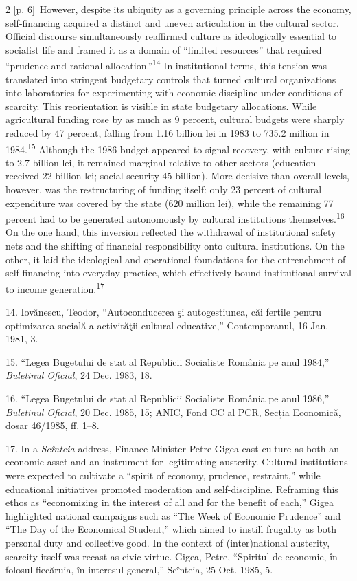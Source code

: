 \documentclass[10pt,a4paper]{article}
\begin{document}
\begin{paracol}{2}
{\scriptsize\color{gray} [p. 6]}\ However, despite its ubiquity as a governing principle across the economy, self-financing acquired a distinct and uneven articulation in the cultural sector. Official discourse simultaneously reaffirmed culture as ideologically essential to socialist life and framed it as a domain of “limited resources” that required “prudence and rational allocation.”\nobreak\textsuperscript{14} In institutional terms, this tension was translated into stringent budgetary controls that turned cultural organizations into laboratories for experimenting with economic discipline under conditions of scarcity. This reorientation is visible in state budgetary allocations. While agricultural funding rose by as much as 9 percent, cultural budgets were sharply reduced by 47 percent, falling from 1.16 billion lei in 1983 to 735.2 million in 1984.\nobreak\textsuperscript{15} Although the 1986 budget appeared to signal recovery, with culture rising to 2.7 billion lei, it remained marginal relative to other sectors (education received 22 billion lei; social security 45 billion). More decisive than overall levels, however, was the restructuring of funding itself: only 23 percent of cultural expenditure was covered by the state (620 million lei), while the remaining 77 percent had to be generated autonomously by cultural institutions themselves.\nobreak\textsuperscript{16} On the one hand, this inversion reflected the withdrawal of institutional safety nets and the shifting of financial responsibility onto cultural institutions. On the other, it laid the ideological and operational foundations for the entrenchment of self-financing into everyday practice, which effectively bound institutional survival to income generation.\nobreak\textsuperscript{17}\par{\small 14. Iovănescu, Teodor, “Autoconducerea şi autogestiunea, căi fertile pentru optimizarea socială a activităţii cultural-educative,” Contemporanul, 16 Jan. 1981, 3.\par}{\small 15. “Legea Bugetului de stat al Republicii Socialiste România pe anul 1984,” \textit{Buletinul Oficial}, 24 Dec. 1983, 18.\par}{\small 16. “Legea Bugetului de stat al Republicii Socialiste România pe anul 1986,” \textit{Buletinul Oficial}, 20 Dec. 1985, 15; ANIC, Fond CC al PCR, Secția Economică, dosar 46/1985, ff. 1–8.\par}{\small 17. In a \textit{Scînteia} address, Finance Minister Petre Gigea cast culture as both an economic asset and an instrument for legitimating austerity. Cultural institutions were expected to cultivate a “spirit of economy, prudence, restraint,” while educational initiatives promoted moderation and self-discipline. Reframing this ethos as “economizing in the interest of all and for the benefit of each,” Gigea highlighted national campaigns such as “The Week of Economic Prudence” and “The Day of the Economical Student,” which aimed to instill frugality as both personal duty and collective good. In the context of (inter)national austerity, scarcity itself was recast as civic virtue. Gigea, Petre, “Spiritul de economie, în folosul fiecăruia, în interesul general,” Scînteia, 25 Oct. 1985, 5.\par}

\end{paracol}
\end{document}
